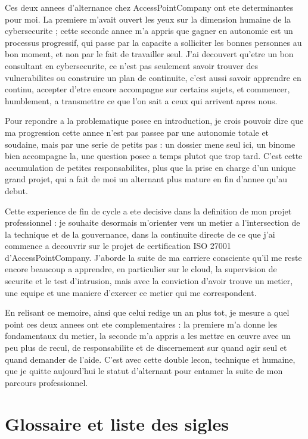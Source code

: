 \documentclass[11pt,a4paper]{article}
\begin{document}
Ces deux annees d'alternance chez AccessPointCompany ont ete determinantes pour moi. La premiere m'avait ouvert les yeux sur la dimension humaine de la cybersecurite ; cette seconde annee m'a appris que gagner en autonomie est un processus progressif, qui passe par la capacite a solliciter les bonnes personnes au bon moment, et non par le fait de travailler seul. J'ai decouvert qu'etre un bon consultant en cybersecurite, ce n'est pas seulement savoir trouver des vulnerabilites ou construire un plan de continuite, c'est aussi savoir apprendre en continu, accepter d'etre encore accompagne sur certains sujets, et commencer, humblement, a transmettre ce que l'on sait a ceux qui arrivent apres nous.

Pour repondre a la problematique posee en introduction, je crois pouvoir dire que ma progression cette annee n'est pas passee par une autonomie totale et soudaine, mais par une serie de petits pas : un dossier mene seul ici, un binome bien accompagne la, une question posee a temps plutot que trop tard. C'est cette accumulation de petites responsabilites, plus que la prise en charge d'un unique grand projet, qui a fait de moi un alternant plus mature en fin d'annee qu'au debut.

Cette experience de fin de cycle a ete decisive dans la definition de mon projet professionnel : je souhaite desormais m'orienter vers un metier a l'intersection de la technique et de la gouvernance, dans la continuite directe de ce que j'ai commence a decouvrir sur le projet de certification ISO 27001 d'AccessPointCompany. J'aborde la suite de ma carriere consciente qu'il me reste encore beaucoup a apprendre, en particulier sur le cloud, la supervision de securite et le test d'intrusion, mais avec la conviction d'avoir trouve un metier, une equipe et une maniere d'exercer ce metier qui me correspondent.

En relisant ce memoire, ainsi que celui redige un an plus tot, je mesure a quel point ces deux annees ont ete complementaires : la premiere m'a donne les fondamentaux du metier, la seconde m'a appris a les mettre en \oe uvre avec un peu plus de recul, de responsabilite et de discernement sur quand agir seul et quand demander de l'aide. C'est avec cette double lecon, technique et humaine, que je quitte aujourd'hui le statut d'alternant pour entamer la suite de mon parcours professionnel.

\newpage
\section*{Glossaire et liste des sigles}
\end{document}
